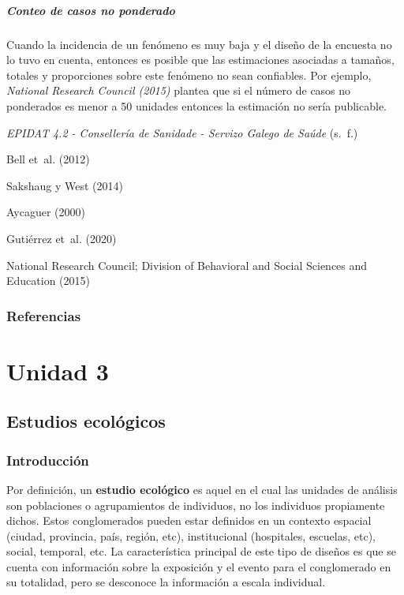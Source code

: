 \documentclass[
  spanish,
  a4paper,
]{scrbook}
\begin{document}
\subsubsection{Conteo de casos no
ponderado}\label{conteo-de-casos-no-ponderado}

Cuando la incidencia de un fenómeno es muy baja y el diseño de la
encuesta no lo tuvo en cuenta, entonces es posible que las estimaciones
asociadas a tamaños, totales y proporciones sobre este fenómeno no sean
confiables. Por ejemplo, \emph{National Research Council (2015)} plantea
que si el número de casos no ponderados es menor a 50 unidades entonces
la estimación no sería publicable.

\emph{{EPIDAT} 4.2 - {Consellería} de {Sanidade} - {Servizo} {Galego} de
{Saúde}} (s.~f.)

Bell et~al. (2012)

Sakshaug y West (2014)

Aycaguer (2000)

Gutiérrez et~al. (2020)

National Research Council; Division of Behavioral and Social Sciences
and Education (2015)

\section{Referencias}\label{referencias-10}

\part{Unidad 3}

\chapter{Estudios ecológicos}\label{estudios-ecoluxf3gicos}

\section{Introducción}\label{introducciuxf3n-10}

Por definición, un \textbf{estudio ecológico} es aquel en el cual las
unidades de análisis son poblaciones o agrupamientos de individuos, no
los individuos propiamente dichos. Estos conglomerados pueden estar
definidos en un contexto espacial (ciudad, provincia, país, región,
etc), institucional (hospitales, escuelas, etc), social, temporal, etc.
La característica principal de este tipo de diseños es que se cuenta con
información sobre la exposición y el evento para el conglomerado en su
totalidad, pero se desconoce la información a escala individual.
\end{document}
